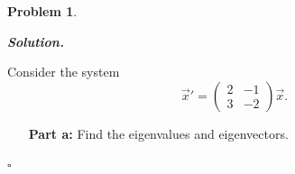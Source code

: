 \documentclass[12pt]{report}
\newtheorem{problem}{Problem}
\newenvironment{solution}[1][\it{Solution}]{\textbf{#1. } }{$\square$}
\begin{document}


\begin{problem}
    
\end{problem}

\begin{solution}

    
    \noindent
    Consider the system
    \[ \vec{x}' = \begin{pmatrix}
        2 & -1\\
        3 & -2
    \end{pmatrix}\vec{x}.\]
    \begin{enumerate}
        \item [{\bf Part a:}] Find the eigenvalues and eigenvectors.
        

\end{enumerate}
\end{solution}
\end{document}
